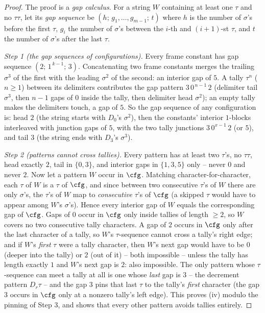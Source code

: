 \begin{proof}
The proof is a \emph{gap calculus}.  For a string $W$ containing at
least one $\tau$ and no $\tau\tau$, let its \emph{gap sequence} be
$(h;\,g_1,\dots,g_{m-1};\,t)$ where $h$ is the number of $\sigma$'s
before the first $\tau$, $g_i$ the number of $\sigma$'s between the
$i$-th and $(i{+}1)$-st $\tau$, and $t$ the number of $\sigma$'s after
the last $\tau$.

\emph{Step 1 (the gap sequences of configurations).}  Every frame
constant has gap sequence $(2;\,1^{\,k-1};\,3)$.  Concatenating two
frame constants merges the trailing $\sigma^3$ of the first with the
leading $\sigma^2$ of the second: an interior gap of $5$.  A tally
$\tau^{n}$ ($n\ge 1$) between its delimiters contributes the gap
pattern $3\,0^{\,n-1}\,2$ (delimiter tail $\sigma^3$, then $n-1$ gaps
of $0$ inside the tally, then delimiter head $\sigma^2$); an empty
tally makes the delimiters touch, a gap of $5$.  So the gap sequence
of any configuration is: head $2$ (the string starts with $D_0$'s
$\sigma^2$), then the constants' interior $1$-blocks interleaved with
junction gaps of $5$, with the two tally junctions $3\,0^{x-1}\,2$
(or $5$), and tail $3$ (the string ends with $D_3$'s $\sigma^3$).

\emph{Step 2 (patterns cannot cross tallies).}  Every pattern has at
least two $\tau$'s, no $\tau\tau$, head exactly $2$, tail in
$\{0,3\}$, and interior gaps in $\{1,3,5\}$ only -- never $0$ and
never $2$.  Now let a pattern $W$ occur in $\cfg$.  Matching
character-for-character, each $\tau$ of $W$ is a $\tau$ of $\cfg$,
and since between two consecutive $\tau$'s of $W$ there are only
$\sigma$'s, the $\tau$'s of $W$ map to \emph{consecutive} $\tau$'s of
$\cfg$ (a skipped $\tau$ would have to appear among $W$'s
$\sigma$'s).  Hence every interior gap of $W$ equals the
corresponding gap of $\cfg$.  Gaps of $0$ occur in $\cfg$ only
inside tallies of length $\ge 2$, so $W$ covers no two consecutive
tally characters.  A gap of $2$ occurs in $\cfg$ only after the last
character of a tally, so $W$'s $\tau$-sequence cannot cross a tally's
right edge; and if $W$'s \emph{first} $\tau$ were a tally character,
then $W$'s next gap would have to be $0$ (deeper into the tally) or
$2$ (out of it) -- both impossible -- unless the tally has length
exactly $1$ and $W$'s next gap is $2$: also impossible.  The only
pattern whose $\tau$-sequence can meet a tally at all is one whose
\emph{last} gap is $3$ -- the decrement pattern $D_r\tau$ -- and the
gap $3$ pins that last $\tau$ to the tally's \emph{first} character
(the gap $3$ occurs in $\cfg$ only at a nonzero tally's left edge).
This proves (iv) modulo the pinning of Step 3, and shows that every
other pattern avoids tallies entirely.


\end{proof}
